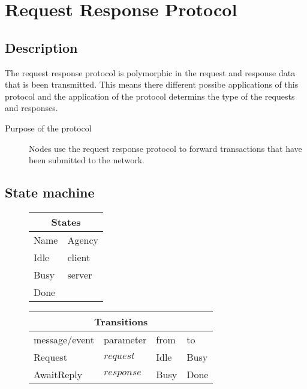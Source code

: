\documentclass{report}
\newcommand{\hsref}[1]{} %
\theoremstyle{definition}{
  \newtheorem{lemma}{Lemma}[section] %
  \newtheorem{definition}[lemma]{Definition}
}
\theoremstyle{theorem}{
  \newtheorem{invariant}[lemma]{Invariant}
  \newtheorem{proofobligation}[lemma]{Proof Obligation}
}
\numberwithin{equation}{lemma}
\begin{document}
\section{Request Response Protocol}
\label{request-response-protocol}
\subsection{Description}
The request response protocol is polymorphic in the request and response data that is been transmitted.
This means there different possibe applications of this protocol and the
application of the protocol determins the type of the requests and responses.

\begin{description}
\item[Purpose of the protocol]
  Nodes use the request response protocol to forward transactions that have been
  submitted to the network.
\end{description}

\subsection{State machine}
\hsref{ouroboros-network/src/Ouroboros/Network/Protocol/ReqResp/Type.hs}
\begin{figure}[H]
\begin{tabular}{|l|l|}
  \hline
  \multicolumn{2}{|c|}{States} \\ \hline
  Name  & Agency \\ \hline \hline
  Idle       & client \\ \hline
  Busy   & server \\ \hline
  Done       &        \\ \hline
  \hline
\end{tabular}
\end{figure}

\begin{figure}[H]
\begin{tabular}{|l|l|l|l|}
  \hline
  \multicolumn{4}{|c|}{Transitions} \\ \hline
  message/event      & parameter              & from        & to       \\ \hline\hline
  Request            & $request$              & Idle        & Busy      \\ \hline
  AwaitReply         & $response$             & Busy        & Done \\ \hline
\end{tabular}
\end{figure}
\end{document}
